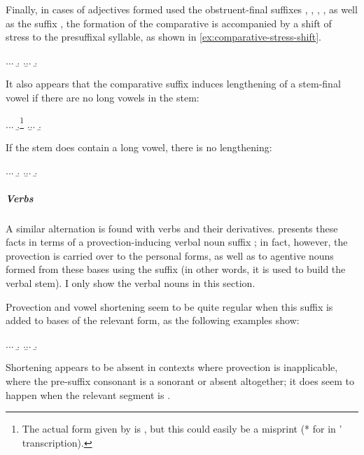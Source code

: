 Finally, in cases of adjectives formed used the obstruent-final suffixes , , , , as well as the suffix , the formation of the comparative is accompanied by a shift of stress to the presuffixal syllable, as shown in \cref{ex:comparative-stress-shift}.

\ex.\label{ex:comparative-stress-shift}\a.\a.
\b.
\z.\b.\a.
\b.

It also appears that the comparative suffix induces lengthening of a stem-final vowel if there are no long vowels in the stem:

\ex.\a.\a.
\b.\footnote{The actual form given by \citet[p.~268]{humphreys95:_phonol_bothoa_saint_nicol_pelem} is \ipa{[neˈvɛːɒh]}, but this could easily be a misprint (* for  in \citeauthor{humphreys95:_phonol_bothoa_saint_nicol_pelem}' transcription).}
\z.\b.\a.
\b.

If the stem does contain a long vowel, there is no lengthening:

\ex.\a.\a.
\b.
\z.\b.\a.
\b.


\subparagraph{Verbs}
\label{sec:verbs}

A similar alternation is found with verbs and their derivatives. \citet{humphreys95:_phonol_bothoa_saint_nicol_pelem} presents these facts in terms of a provection-inducing verbal noun suffix ; in fact, however, the provection is carried over to the personal forms, as well as to agentive nouns formed from these bases using the suffix  (in other words, it is used to build the verbal stem). I only show the verbal nouns in this section.

Provection and vowel shortening seem to be quite regular when this suffix is added to bases of the relevant form, as the following examples show:

\ex.\a.\a.
\b.
\z.\b.\a.
\b.


Shortening appears to be absent in contexts where provection is inapplicable, \ie where the pre-suffix consonant is a sonorant or absent altogether; it does seem to happen when the relevant segment is .

